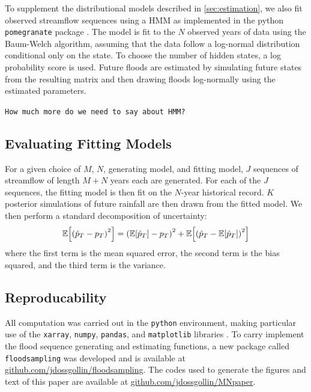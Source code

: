 \documentclass[12pt]{article}
\begin{document}
To supplement the distributional models described in \cref{sec:estimation}, we also fit observed streamflow sequences using a HMM as implemented in the python \texttt{pomegranate} package \citep{Schreiber2016}.
The model is fit to the \(N\) observed years of data using the Baum-Welch algorithm, assuming that the data follow a log-normal distribution conditional only on the state.
To choose the number of hidden states, a log probability score is used.
Future floods are estimated by simulating future states from the resulting matrix and then drawing floods log-normally using the estimated parameters.

\texttt{How much more do we need to say about HMM?}

\subsection{Evaluating Fitting Models}

For a given choice of \(M\), \(N\), generating model, and fitting model, \(J\) sequences of streamflow of length \(M+N\) years each are generated.
For each of the \(J\) sequences, the fitting model is then fit on the \(N\)-year historical record.
\(K\) posterior simulations of future rainfall are then drawn from the fitted model.
We then perform a standard decomposition of uncertainty:
\begin{equation}
  \mathbb{E} \qty[ \qty( \hat{p}_T - p_T )^2 ] = \qty( \mathbb{E} \qty[ \hat{p}_T ] - p_T )^2 + \mathbb{E} \qty[ \qty( \hat{p}_T - \mathbb{E} \qty[ \hat{p}_T ] )^2]
\end{equation}
where the first term is the mean squared error, the second term is the bias squared, and the third term is the variance.

\subsection{Reproducability}

All computation was carried out in the \texttt{python} environment, making particular use of the \texttt{xarray}, \texttt{numpy}, \texttt{pandas}, and \texttt{matplotlib} libraries \citep{Hoyer2017,vanderWalt2011,McKinney2010,Hunter2007}.
To carry implement the flood sequence generating and estimating functions, a new package called \texttt{floodsampling} was developed and is available at \url{github.com/jdossgollin/floodsampling}.
The codes used to generate the figures and text of this paper are available at \url{github.com/jdossgollin/MNpaper}.
\end{document}
